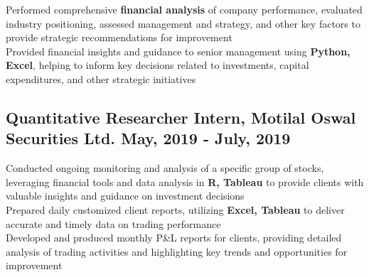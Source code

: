\documentclass[]{resume}
\begin{document}
\begin{adjustwidth}{0.5cm}{0cm}

    \pt Performed comprehensive \textbf{financial analysis} of company performance, evaluated industry positioning, assessed management and strategy, and other key factors to provide strategic recommendations for improvement \\


    \pt Provided financial insights and guidance to senior management using \textbf{Python, Excel}, helping to inform key decisions related to investments, capital expenditures, and other strategic initiatives \\



\end{adjustwidth}

\sectionsep

\subsection{Quantitative Researcher Intern, Motilal Oswal Securities Ltd. \hfill \normalfont May, 2019 - July, 2019}

\begin{adjustwidth}{0.5cm}{0cm}
    \pt Conducted ongoing monitoring and analysis of a specific group of stocks, leveraging financial tools and data analysis in \textbf{R, Tableau} to provide clients with valuable insights and guidance on investment decisions \\
    \pt Prepared daily customized client reports, utilizing \textbf{Excel, Tableau} to deliver accurate and timely data on trading performance \\
    \pt Developed and produced monthly P\&L reports for clients, providing detailed analysis of trading activities and highlighting key trends and opportunities for improvement \\
    
    \sectionsep
\end{adjustwidth}
\end{document}
